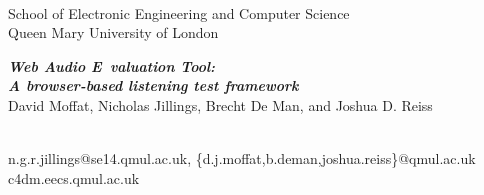 
\begin{center}
\colorbox{qmuldarkblue}
{
 \color{white}

 \parbox{1.0\textwidth}
 {
  \parbox{0.2\textwidth}
  {
   \begin{center}
   \\[1ex]
   \textrm
   {
    \footnotesize
    School of Electronic Engineering and Computer Science\\
    Queen Mary University of London\\
   }
   \end{center}
  }
  \parbox{0.58\textwidth}
  {
   \vspace{1cm}
   \begin{center}
   \textrm
   {
    {\veryHuge \bf \em Web Audio E valuation Tool:\\ A browser-based listening test framework}\\[1ex]
    {\Large       David Moffat, Nicholas Jillings, Brecht De Man, and Joshua D. Reiss}
   }    
   \end{center}
   \vspace{1cm}
  }
  \parbox{0.2\textwidth}
  {
   \begin{center}
   \\[1ex]
   \textrm
   {
    \small
    n.g.r.jillings@se14.qmul.ac.uk, \{d.j.moffat,b.deman,joshua.reiss\}@qmul.ac.uk\\
    c4dm.eecs.qmul.ac.uk\\
   }
   \end{center}
  }
 }
}
\end{center}
